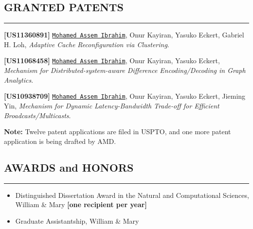 \documentclass[10pt,a4]{article}
\begin{document}
\subsection*{GRANTED PATENTS}
\hrule
\vspace{0.2cm}

\begin{description}

\item 
{\bf [US11360891]}
{\tt \underline{Mohamed Assem Ibrahim}}, Onur Kayiran, Yasuko Eckert, Gabriel H. Loh,
{\it Adaptive Cache Reconfiguration via Clustering}.

\item 
{\bf [US11068458]}
{\tt \underline{Mohamed Assem Ibrahim}}, Onur Kayiran, Yasuko Eckert,
{\it Mechanism for Distributed-system-aware Difference Encoding/Decoding in Graph Analytics}.

\item 
{\bf [US10938709]}
{\tt \underline{Mohamed Assem Ibrahim}}, Onur Kayiran, Yasuko Eckert, Jieming Yin,
{\it Mechanism for Dynamic Latency-Bandwidth Trade-off for Efficient Broadcasts/Multicasts}.

\item 
{\bf Note:} Twelve patent applications are filed in USPTO, and one more patent application is being drafted by AMD.

\end{description}

\subsection*{AWARDS and HONORS}
\hrule
\vspace{0.2cm}
\begin{itemize}
\item Distinguished Dissertation Award in the Natural and Computational Sciences, William \& Mary {\bf [one recipient per year]}
\item Graduate Assistantship, William \& Mary
\end{itemize}
\end{document}
